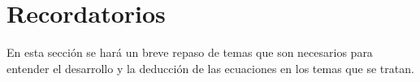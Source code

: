\graphicspath{ {./images/9_reminders/} }

\chapter{Recordatorios}

En esta sección se hará un breve repaso de temas que son necesarios para entender el desarrollo y la deducción de las ecuaciones en los temas que se tratan.




